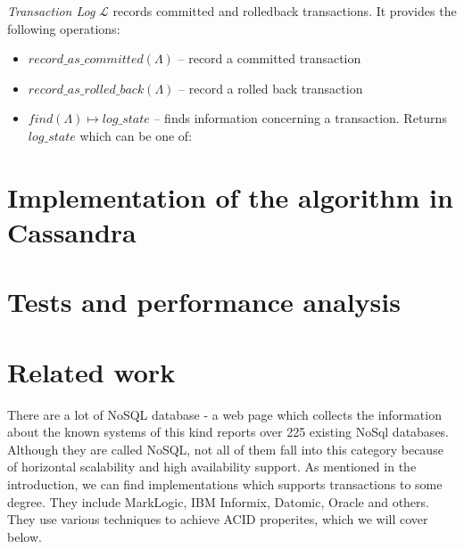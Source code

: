 \documentclass[runningheads,a4paper]{llncs}
\newcommand{\txLog}{$\mathcal{L}$\xspace}
\newcommand{\txState}{$\Lambda$\xspace}
\begin{document}
\begin{definition}
\label{def:transactionLog}
\emph{Transaction Log} \txLog records committed and rolledback transactions. It provides the following operations:
\begin{itemize}
\item $\mathit{record\_as\_committed(\text{\txState})}$ -- record a committed transaction
\item $\mathit{record\_as\_rolled\_back(\text{\txState})}$ -- record a rolled back transaction
\item $\mathit{find(\text{\txState})} \mapsto \mathit{log\_state}$ -- finds information concerning a transaction. Returns $\mathit{log\_state}$ which can be one of:  
\end{itemize}

\end{definition}

\section{Implementation of the algorithm in Cassandra}

\section{Tests and performance analysis}

\section{Related work}

There are a lot of NoSQL database - a web page which collects the information
about the known systems of this kind \cite{NoSqlDatabasesOrg} reports over 225
existing NoSql databases. Although they are called NoSQL, not all of them fall 
into this category because of horizontal scalability and high availability support. 
As mentioned in the introduction, we can find implementations which supports 
transactions to some degree. They include MarkLogic, IBM Informix, Datomic, 
Oracle and others. They use various techniques to achieve ACID properites, which 
we will cover below. 
\end{document}
